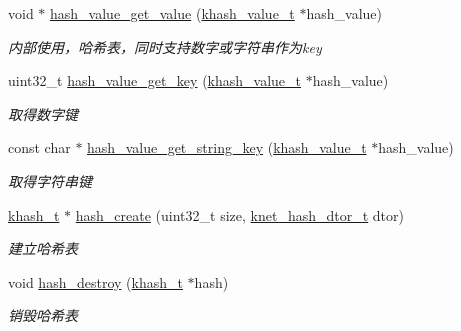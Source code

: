 \begin{DoxyCompactItemize}
void $\ast$ \hyperlink{a00064_aab909a28870f824900d55d4158ecf807_aab909a28870f824900d55d4158ecf807}{hash\+\_\+value\+\_\+get\+\_\+value} (\hyperlink{a00053_aa13ac88a5567525fe44f3670134c3d96_aa13ac88a5567525fe44f3670134c3d96}{khash\+\_\+value\+\_\+t} $\ast$hash\+\_\+value)
\begin{DoxyCompactList}\small\item\em 内部使用，哈希表，同时支持数字或字符串作为key \end{DoxyCompactList}\item 
uint32\+\_\+t \hyperlink{a00064_ae2eae4207ed7825a923eb744b1b03be0_ae2eae4207ed7825a923eb744b1b03be0}{hash\+\_\+value\+\_\+get\+\_\+key} (\hyperlink{a00053_aa13ac88a5567525fe44f3670134c3d96_aa13ac88a5567525fe44f3670134c3d96}{khash\+\_\+value\+\_\+t} $\ast$hash\+\_\+value)
\begin{DoxyCompactList}\small\item\em 取得数字键 \end{DoxyCompactList}\item 
const char $\ast$ \hyperlink{a00064_ae64de86e8fdc8f5e278cebe0f9856c09_ae64de86e8fdc8f5e278cebe0f9856c09}{hash\+\_\+value\+\_\+get\+\_\+string\+\_\+key} (\hyperlink{a00053_aa13ac88a5567525fe44f3670134c3d96_aa13ac88a5567525fe44f3670134c3d96}{khash\+\_\+value\+\_\+t} $\ast$hash\+\_\+value)
\begin{DoxyCompactList}\small\item\em 取得字符串键 \end{DoxyCompactList}\item 
\hyperlink{a00053_aa242a9a673d8677076543d5768798f2c_aa242a9a673d8677076543d5768798f2c}{khash\+\_\+t} $\ast$ \hyperlink{a00064_aa4a5b9547c52b16f292c317a41f69d24_aa4a5b9547c52b16f292c317a41f69d24}{hash\+\_\+create} (uint32\+\_\+t size, \hyperlink{a00053_af806592520383146be2f3aac316beb45_af806592520383146be2f3aac316beb45}{knet\+\_\+hash\+\_\+dtor\+\_\+t} dtor)
\begin{DoxyCompactList}\small\item\em 建立哈希表 \end{DoxyCompactList}\item 
void \hyperlink{a00064_a7c2257af49b4f207001c43e43514a226_a7c2257af49b4f207001c43e43514a226}{hash\+\_\+destroy} (\hyperlink{a00053_aa242a9a673d8677076543d5768798f2c_aa242a9a673d8677076543d5768798f2c}{khash\+\_\+t} $\ast$hash)
\begin{DoxyCompactList}\small\item\em 销毁哈希表 \end{DoxyCompactList}\item 

\end{DoxyCompactItemize}
